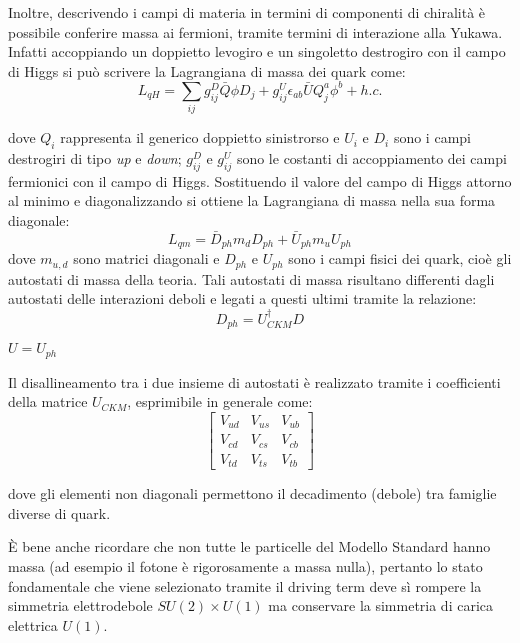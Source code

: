 \medskip
Inoltre, descrivendo i campi di materia in termini di componenti di chiralità è possibile conferire massa ai fermioni, tramite
termini di interazione alla Yukawa. Infatti accoppiando un doppietto levogiro e un singoletto destrogiro con il campo di Higgs si può
scrivere la Lagrangiana di massa dei quark come:
\begin{equation}
 L_{qH}=\sum_{ij}g_{ij}^{D}\bar{Q}\phi D_{j}+g_{ij}^{U}\epsilon_{ab}\bar{U}Q^{a}_{j}\phi^{b}+h.c.
\end{equation}

dove $Q_{i}$ rappresenta il generico doppietto sinistrorso e $U_{i}$ e $D_{i}$ sono i campi destrogiri di tipo \textit{up} e \textit{down};
$g_{ij}^{D}$ e $g_{ij}^{U}$ sono le costanti di accoppiamento dei campi fermionici con il campo di Higgs.
Sostituendo il valore del campo di Higgs attorno al minimo e diagonalizzando si ottiene la Lagrangiana di massa nella sua forma diagonale:
\begin{equation}
 L_{qm}=\bar{D}_{ph}m_{d}D_{ph}+\bar{U}_{ph}m_{u}U_{ph}
\end{equation}
dove $m_{u,d}$ sono matrici diagonali e $D_{ph}$ e $U_{ph}$ sono i campi fisici dei quark, cioè gli autostati di massa della teoria.
Tali autostati di massa risultano differenti dagli autostati delle interazioni deboli e legati a questi ultimi tramite la relazione:
\begin{equation}
 D_{ph}=U^{\dag}_{CKM}D
\end{equation}
\begin{center}
 $U=U_{ph}$
\end{center}

Il disallineamento tra i due insieme di autostati è realizzato tramite i coefficienti della matrice $U_{CKM}$, esprimibile in generale come:
\begin{equation}
\begin{bmatrix} V_{ud} & V_{us} & V_{ub} \\ V_{cd} & V_{cs} & V_{cb} \\ V_{td} & V_{ts} & V_{tb} \end{bmatrix}
\end{equation}

dove gli elementi non diagonali permettono il decadimento (debole) tra famiglie diverse di quark.


\medskip
\`{E} bene anche ricordare che non tutte le particelle del Modello Standard hanno massa (ad esempio il fotone è rigorosamente a massa nulla), 
pertanto lo stato fondamentale che viene selezionato tramite il driving term deve sì rompere la simmetria elettrodebole $SU(2)\times U(1)$ ma
conservare la simmetria di carica elettrica $U(1)$.

